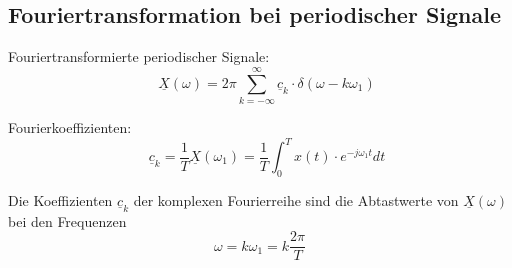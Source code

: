 \subsection{Fouriertransformation bei periodischer Signale}
\begin{mdframed}[style=exercise]

Fouriertransformierte periodischer Signale:
\[
    \quad \underline{X}(\omega) =
    2\pi\sum_{k=-\infty}^{\infty} \underline{c}_k\cdot
    \delta(\omega-k\omega_1)
\]

Fourierkoeffizienten:
\[
    \quad \underline{c}_k =
    \frac{1}{T}\underline{X}(\omega_1) =
    \frac{1}{T}\int_0^T x(t) \cdot e^{-j\omega_1 t} dt
\]

Die Koeffizienten $\underline{c}_k $ der komplexen Fourierreihe sind die
Abtastwerte von $\underline{X}(\omega)$ bei den Frequenzen
\[\omega=k\omega_1=k\frac{2\pi}{T}\]
\end{mdframed}
